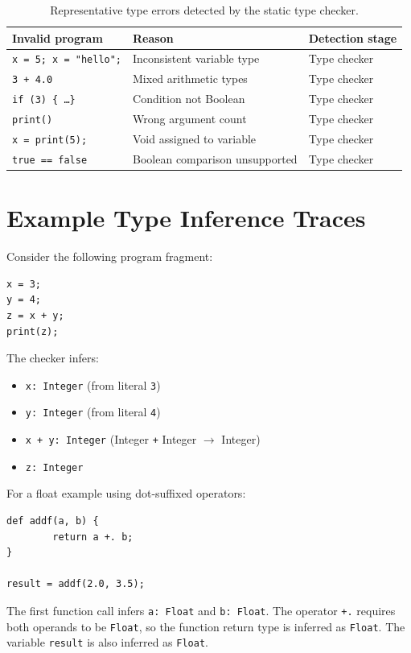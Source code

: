 \begin{table}[H]
\centering
\caption{Representative type errors detected by the static type checker.\label{tab:type-errors}}
\small
\begin{tabular}{p{5.4cm}p{5.4cm}p{2.4cm}}
\toprule
Invalid program & Reason & Detection stage \\
\midrule
\verb|x = 5; x = "hello";| & Inconsistent variable type & Type checker \\
\texttt{3 + 4.0}             & Mixed arithmetic types     & Type checker \\
\texttt{if (3) \{ \ldots \}} & Condition not Boolean      & Type checker \\
\verb|print()|               & Wrong argument count       & Type checker \\
\verb|x = print(5);|         & Void assigned to variable  & Type checker \\
\texttt{true == false}       & Boolean comparison unsupported & Type checker \\
\bottomrule
\end{tabular}
\end{table}

\section{Example Type Inference Traces}
Consider the following program fragment:

\begin{lstlisting}
x = 3;
y = 4;
z = x + y;
print(z);
\end{lstlisting}

The checker infers:
\begin{itemize}
	\item \texttt{x: Integer} (from literal \texttt{3})
	\item \texttt{y: Integer} (from literal \texttt{4})
	\item \texttt{x + y: Integer} (Integer \texttt{+} Integer $\rightarrow$ Integer)
	\item \texttt{z: Integer}
\end{itemize}

For a float example using dot-suffixed operators:

\begin{lstlisting}
def addf(a, b) {
		return a +. b;
}

result = addf(2.0, 3.5);
\end{lstlisting}

The first function call infers \texttt{a: Float} and \texttt{b: Float}. The
operator \texttt{+.} requires both operands to be \texttt{Float}, so the
function return type is inferred as \texttt{Float}. The variable
\texttt{result} is also inferred as \texttt{Float}.

